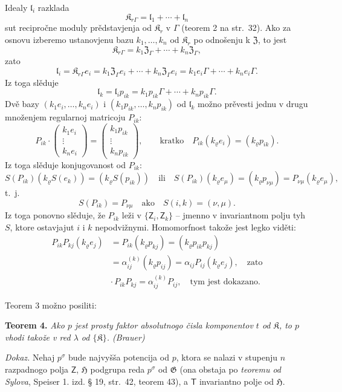 \documentclass[11pt]{article}
\begin{document}
Idealy \(\mathfrak l_i\) razklada
\[
\mathfrak K_{r\Gamma}=\mathfrak l_1+\cdots+\mathfrak l_n
\]
sut recipročne moduly prědstavjenja od \(\mathfrak K_r\) v \(\Gamma\) (teorem 2 na str.~32). Ako za osnovu izberemo ustanovjenu bazu \(k_1,\ldots,k_n\) od \(\mathfrak K_r\) po odnošenju k \(\mathfrak Z\), to jest
\[
\mathfrak K_{r\Gamma}=k_1\mathfrak Z_\Gamma+\cdots+k_n\mathfrak Z_\Gamma,
\]
zato
\[
\mathfrak l_i=\mathfrak K_{r\Gamma}e_i
=k_1\mathfrak Z_\Gamma e_i+\cdots+k_n\mathfrak Z_\Gamma e_i
=k_1e_i\Gamma+\cdots+k_ne_i\Gamma.
\]
Iz toga slěduje
\[
\mathfrak l_k=\mathfrak l_i p_{ik}
=k_1p_{ik}\Gamma+\cdots+k_np_{ik}\Gamma.
\]
Dvě bazy \((k_1e_i,\ldots,k_ne_i)\) i \((k_1p_{ik},\ldots,k_np_{ik})\) od \(\mathfrak l_k\) možno prěvesti jednu v drugu množenjem regularnoj matricoju \(P_{ik}\):
\[
P_{ik}\cdot
\begin{pmatrix}
k_1e_i\\ \vdots\\ k_ne_i
\end{pmatrix}
=
\begin{pmatrix}
k_1p_{ik}\\ \vdots\\ k_np_{ik}
\end{pmatrix},
\qquad
\text{kratko}\quad
P_{ik}(k_\varrho e_i)=(k_\varrho p_{ik}).
\]
Iz toga slěduje konjugovanost od \(P_{ik}\):
\[
S(P_{ik})(k_\varrho S(e_k))=(k_\varrho S(p_{ik}))
\quad\text{ili}\quad
S(P_{ik})(k_\varrho e_\mu)=(k_\varrho p_{\nu\mu})
=P_{\nu\mu}(k_\varrho e_\mu),
\]
t.~j.
\[
S(P_{ik})=P_{\nu\mu}\quad\text{ako}\quad S(i,k)=(\nu,\mu).
\]
Iz toga ponovno slěduje, že \(P_{ik}\) leži v \(\{\mathsf{Z}_i,\mathsf{Z}_k\}\) -- jmenno v invariantnom polju tyh \(S\), ktore ostavjajut \(i\) i \(k\) nepodvižnymi. Homomorfnost takože jest legko viděti:
\[
\begin{split}
P_{ik}P_{kj}(k_\varrho e_j)
&=P_{ik}(k_\varrho p_{kj})
=(k_\varrho p_{ik}p_{kj})\\
&=\alpha_{ij}^{(k)}(k_\varrho p_{ij})
=\alpha_{ij}P_{ij}(k_\varrho e_j),
\quad\text{zato}\\
&\cdot\, P_{ik}P_{kj}=\alpha_{ij}^{(k)}P_{ij},
\quad\text{tym jest dokazano.}
\end{split}
\]

Teorem 3 možno posiliti:

\textbf{Teorem 4.} \emph{Ako \(p\) jest prosty faktor absolutnogo čisla komponentov \(t\) od \(\mathfrak K\), to \(p\) vhodi takože v red \(\lambda\) od \(\{\mathfrak K\}\). (Brauer)}

\emph{Dokaz.} Nehaj \(p^\sigma\) bude najvyšša potencija od \(p\), ktora se nalazi v stupenju \(n\) razpadnogo polja \(\mathsf{Z}\), \(\mathfrak H\) podgrupa reda \(p^\sigma\) od \(\mathfrak G\) (ona obstaja po \emph{teoremu od Sylova}, Speiser 1. izd. § 19, str.~42, teorem 43), a \(\mathsf{T}\) invariantno polje od \(\mathfrak H\).
\end{document}
